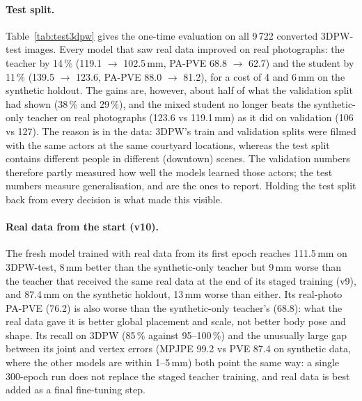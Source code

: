 \paragraph{Test split.} Table~\ref{tab:test3dpw} gives the one-time
evaluation on all 9\,722 converted 3DPW-test images. Every model that saw
real data improved on real photographs: the teacher by 14\,\% (119.1
$\rightarrow$ 102.5\,mm, PA-PVE 68.8 $\rightarrow$ 62.7) and the student by
11\,\% (139.5 $\rightarrow$ 123.6, PA-PVE 88.0 $\rightarrow$ 81.2), for a cost
of 4 and 6\,mm on the synthetic holdout. The gains are, however, about half of
what the validation split had shown (38\,\% and 29\,\%), and the mixed
student no longer beats the synthetic-only teacher on real photographs (123.6
vs 119.1\,mm) as it did on validation (106 vs 127). The reason is in the data:
3DPW's train and validation splits were filmed with the same actors at the
same courtyard locations, whereas the test split contains different people in
different (downtown) scenes. The validation numbers therefore partly measured
how well the models learned those actors; the test numbers measure
generalisation, and are the ones to report. Holding the test split back from
every decision is what made this visible.

\paragraph{Real data from the start (v10).} The fresh model trained with real
data from its first epoch reaches 111.5\,mm on 3DPW-test, 8\,mm better than
the synthetic-only teacher but 9\,mm worse than the teacher that received the
same real data at the end of its staged training (v9), and 87.4\,mm on the
synthetic holdout, 13\,mm worse than either. Its real-photo PA-PVE (76.2) is
also worse than the synthetic-only teacher's (68.8): what the real data gave
it is better global placement and scale, not better body pose and shape. Its
recall on 3DPW (85\,\% against 95--100\,\%) and the unusually large gap
between its joint and vertex errors (MPJPE 99.2 vs PVE 87.4 on synthetic data,
where the other models are within 1--5\,mm) both point the same way: a single
300-epoch run does not replace the staged teacher training, and real data is
best added as a final fine-tuning step.

